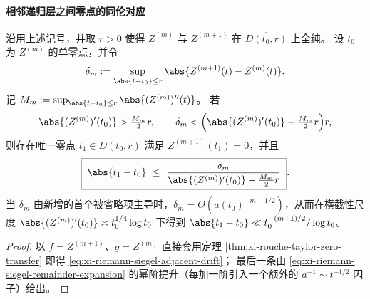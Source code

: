 \paragraph{相邻递归层之间零点的同伦对应}
\begin{proposition}\label{prop:xi-riemann-siegel-adjacent-level-zero-homotopy}
沿用上述记号，并取 \(r>0\) 使得 \(Z^{(m)}\) 与 \(Z^{(m+1)}\) 在 \(\overline{D(t_0,r)}\) 上全纯。
设 \(t_0\) 为 \(Z^{(m)}\) 的单零点，并令
\[
\delta_m:=\sup_{\abs{t-t_0}\le r}\abs{Z^{(m+1)}(t)-Z^{(m)}(t)}.
\]
记 \(M_m:=\sup_{\abs{t-t_0}\le r}\abs{(Z^{(m)})''(t)}\)。
若
\[
\abs{(Z^{(m)})'(t_0)}>\tfrac{M_m}{2}r,
\qquad
\delta_m<\Bigl(\abs{(Z^{(m)})'(t_0)}-\tfrac{M_m}{2}r\Bigr)r,
\]
则存在唯一零点 \(t_1\in D(t_0,r)\) 满足 \(Z^{(m+1)}(t_1)=0\)，并且
\begin{equation}\label{eq:xi-riemann-siegel-adjacent-drift}
\boxed{\;
\abs{t_1-t_0}\ \le\ \frac{\delta_m}{\abs{(Z^{(m)})'(t_0)}-\tfrac{M_m}{2}r}\; }.
\end{equation}
当 \(\delta_m\) 由新增的首个被省略项主导时，\(\delta_m=\Theta(a(t_0)^{-m-1/2})\)，从而在横截性尺度 \(\abs{(Z^{(m)})'(t_0)}\asymp t_0^{1/4}\log t_0\) 下得到
\(
\abs{t_1-t_0}\ll t_0^{-(m+1)/2}/\log t_0
\)。
\end{proposition}
\begin{proof}
以 \(f=Z^{(m+1)}\)、\(g=Z^{(m)}\) 直接套用定理 \ref{thm:xi-rouche-taylor-zero-transfer} 即得 \eqref{eq:xi-riemann-siegel-adjacent-drift}；
最后一条由 \eqref{eq:xi-riemann-siegel-remainder-expansion} 的幂阶提升（每加一阶引入一个额外的 \(a^{-1}\sim t^{-1/2}\) 因子）给出。
\end{proof}

